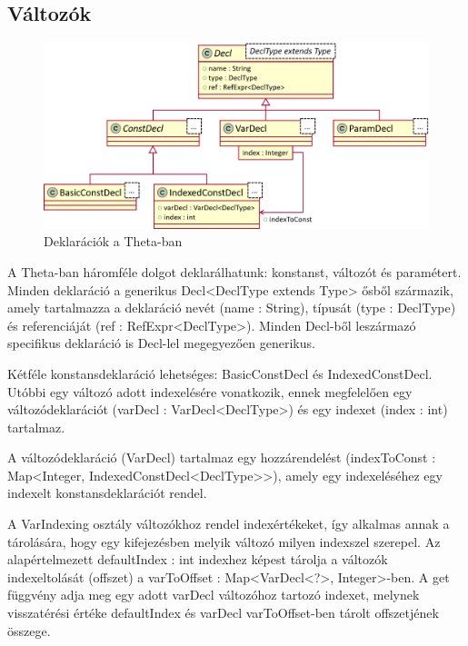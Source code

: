 \subsection{Változók}
\begin{figure}%
    \centering
    \includegraphics[width=\textwidth, keepaspectratio]{src/figures/decl-uml.png}
    \caption{Deklarációk a Theta-ban}
    \label{fig:decl-uml}
\end{figure}

A Theta-ban háromféle dolgot deklarálhatunk: konstanst, változót és paramétert. Minden deklaráció a generikus \textsf{Decl<DeclType extends Type>} ősből származik, amely tartalmazza a deklaráció nevét (\textsf{name : String}), típusát (\textsf{type : DeclType}) és referenciáját (\textsf{ref : RefExpr<DeclType>}). Minden \textsf{Decl}-ből leszármazó specifikus deklaráció is \textsf{Decl}-lel megegyezően generikus.

Kétféle konstansdeklaráció lehetséges: \textsf{BasicConstDecl} és \textsf{IndexedConstDecl}. Utóbbi egy változó adott indexelésére vonatkozik, ennek megfelelően egy változódeklarációt (\textsf{varDecl : VarDecl<DeclType>}) és egy indexet (\textsf{index : int}) tartalmaz.

A változódeklaráció (\textsf{VarDecl}) tartalmaz egy hozzárendelést (\textsf{indexToConst : Map<Integer, IndexedConstDecl<DeclType>{}>}), amely egy indexeléséhez egy indexelt konstansdeklarációt rendel.

A \textsf{VarIndexing} osztály változókhoz rendel indexértékeket, így alkalmas annak a tárolására, hogy egy kifejezésben melyik változó milyen indexszel szerepel. Az alapértelmezett \textsf{defaultIndex : int} indexhez képest tárolja a változók indexeltolását (offszet) a \textsf{varToOffset : Map<VarDecl<?>, Integer>}-ben. A \textsf{get} függvény adja meg egy adott \textsf{varDecl} változóhoz tartozó indexet, melynek visszatérési értéke \textsf{defaultIndex} és \textsf{varDecl} \textsf{varToOffset}-ben tárolt offszetjének összege.

